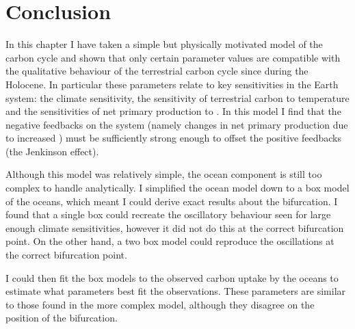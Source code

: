 \section{Conclusion}
In this chapter I have taken a simple but physically motivated model of the carbon cycle and shown that only certain parameter values are compatible with the qualitative behaviour
of the terrestrial carbon cycle since during the Holocene. In particular these parameters relate to key sensitivities in the Earth system: the climate sensitivity, the sensitivity of
terrestrial carbon to temperature and the sensitivities of net primary production to . In this model I find that the negative feedbacks on the system (namely changes in net primary
production due to increased ) must be sufficiently strong enough to offset the positive feedbacks (the Jenkinson effect).

Although this model was relatively simple, the ocean component is still too complex to handle analytically. I simplified the ocean model down to a box model of the oceans,
which meant I could derive exact results about the bifurcation. I found that a single box could recreate the oscillatory behaviour seen for large enough climate sensitivities,
however it did not do this at the correct bifurcation point. On the other hand, a two box model could reproduce the oscillations at the correct bifurcation point.

I could then fit the box models to the observed carbon uptake by the oceans to estimate what parameters best fit the observations. These parameters are similar to those found in the more
complex model, although they disagree on the position of the bifurcation.